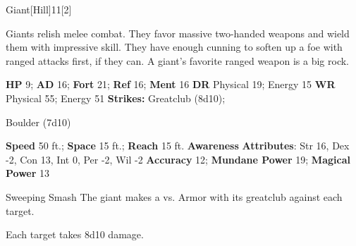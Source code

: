   \begin{monsection}{Giant}[Hill]{11}[2]
    \vspace{-1em}\vspace{-1em}
    \vspace{0em}

    
      Giants relish melee combat.
      They favor massive two-handed weapons and wield them with impressive skill.
      They have enough cunning to soften up a foe with ranged attacks first, if they can.
      A giant's favorite ranged weapon is a big rock.
    

    \begin{spellcontent}
      \begin{spelltargetinginfo}
        \pari \textbf{HP} 9;
          \textbf{AD} 16;
          \textbf{Fort} 21;
          \textbf{Ref} 16;
          \textbf{Ment} 16
        \pari \textbf{DR} Physical 19; Energy 15
        \pari \textbf{WR} Physical 55; Energy 51
        \pari \textbf{Strikes:}
            Greatclub  (8d10);
\par Boulder  (7d10)
      \end{spelltargetinginfo}
    \end{spellcontent}
    \begin{monsterfooter}
      \pari \textbf{Speed} 50 ft.;
        \textbf{Space} 15 ft.;
        \textbf{Reach} 15 ft.
      \pari \textbf{Awareness} 
      \pari \textbf{Attributes}:
        Str 16, Dex -2,
        Con 13, Int 0,
        Per -2, Wil -2
      \pari \textbf{Accuracy} 12;
        \textbf{Mundane Power} 19;
      \textbf{Magical Power} 13
    \end{monsterfooter}
  \end{monsection}
  \begin{freeability}{Sweeping Smash}
       The giant makes a 
         vs. Armor
        with its greatclub against each target.
    
    \hit Each target takes 8d10  damage.
    \end{freeability}
  
